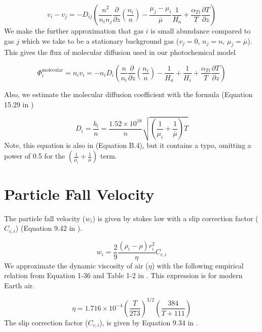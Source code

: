 \begin{equation} \label{eq:molec_diffusion_simplify1}
  v_i - v_j = -D_{ij} \left( \frac{n^2}{n_i n_j} \frac{\partial}{\partial z} \left(\frac{n_i}{n}\right) - \frac{\mu_j - \mu_i}{\overline{\mu}} \frac{1}{H_a} + \frac{\alpha_{Ti}}{T} \frac{\partial T}{\partial z} \right)
\end{equation}
We make the further approximation that gas $i$ is small abundance compared to gas $j$ which we take to be a stationary background gas ($v_j = 0$, $n_j = n$, $\mu_j = \overline{\mu}$). This gives the flux of molecular diffusion used in our photochemical model

\begin{equation} \label{eq:phi_molec_diffusion}
  \Phi_i^\text{molecular} = n_i v_i = -n_i D_{i} \left( \frac{n}{n_i} \frac{\partial}{\partial z} \left(\frac{n_i}{n}\right) - \frac{1}{H_a} + \frac{1}{H_i} + \frac{\alpha_{Ti}}{T} \frac{\partial T}{\partial z} \right)
\end{equation}

Also, we estimate the molecular diffusion coefficient with the formula (Equation 15.29 in \citet{Banks_2013})

\begin{equation} \label{eq:molec_diffusion_coeff}
  D_i = 
  \frac{b_i}{n} = \frac{1.52 \times 10^{18}}{n} \sqrt{\left( \frac{1}{\mu_i} + \frac{1}{\overline{\mu}} \right) T}
\end{equation}
Note, this equation is also in \citet{Catling_2017} (Equation B.4), but it contains a typo, omitting a power of 0.5 for the $\left( \frac{1}{\mu_i} + \frac{1}{\overline{\mu}} \right)$ term.

\section{Particle Fall Velocity} \label{sec:fall_velocity}

The particle fall velocity ($w_i$) is given by stokes law with a slip correction factor ($C_{c,i}$) (Equation 9.42 in \citet{Seinfeld_2006}).

\begin{equation} \label{eq:stokes_law}
  w_i = \frac{2}{9} \frac{(\rho_i - \rho)r_i^2}{\eta} C_{c,i}
\end{equation}
We approximate the dynamic viscosity of air ($\eta$) with the following empirical relation from Equation 1-36 and Table 1-2 in \citet{White_2006}. This expression is for modern Earth air.

\begin{equation} \label{eq:dynamic_viscosity}
  \eta = 1.716 \times 10^{-4} \left(\frac{T}{273}\right)^{3/2} \left( \frac{384}{T + 111} \right)
\end{equation}
The slip correction factor ($C_{c,i}$), is given by Equation 9.34 in \citet{Seinfeld_2006}.

